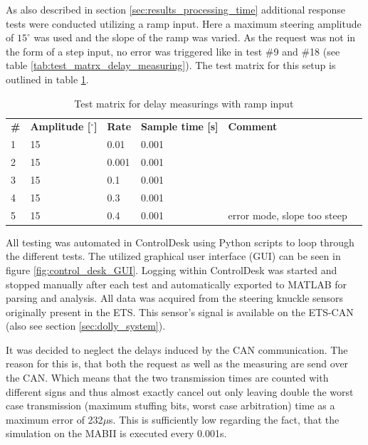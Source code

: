 \documentclass[ExampleMasters.tex]{subfiles}
\begin{document}


As also described in section \ref{sec:results_processing_time} additional response tests were conducted utilizing a ramp input. Here a maximum steering amplitude of $15^\circ $ was used and the slope of the ramp was varied. As the request was not in the form of a step input, no error was triggered like in test \#9 and \#18 (see table \ref{tab:test_matrx_delay_measuring}). The test matrix for this setup is outlined in table \ref{tab:test_matrx_ramp_input}. 

\begin{table}[h]
	\label{tab:test_matrx_ramp_input}
	\centering
\begin{tabular}{llllll}
 \textbf{\#} &\textbf{ Amplitude [$^\circ$]} & \textbf{Rate} & \textbf{Sample time [s]} & \textbf{Comment} &  \\ 
1	  &  15 & 0.01 & 0.001 &   \\ 
2	  & 15 & 0.001 &  0.001&  \\ 
3	  & 15 & 0.1 &  0.001&   \\ 
4	  & 15 & 0.3 & 	 0.001&   \\ 
5	  & 15 & 0.4 & 0.001 &  error mode, slope too steep\\ 

\end{tabular} 
\caption{Test matrix for delay measurings with ramp input}
\end{table}


All testing was automated in ControlDesk using Python scripts to loop through the different tests. The utilized graphical user interface (GUI) can be seen in figure \ref{fig:control_desk_GUI}. Logging within ControlDesk was started and stopped manually after each test and automatically exported to MATLAB for parsing and analysis. All data was acquired from the steering knuckle sensors originally present in the ETS. This sensor's signal is available on the ETS-CAN (also see section \ref{sec:dolly_system}). 

It was decided to neglect the delays induced by the CAN communication. The reason for this is, that both the request as well as the measuring are send over the CAN. Which means that the two transmission times are counted with different signs and thus almost exactly cancel out only leaving double the worst case transmission (maximum stuffing bits, worst case arbitration) time as a maximum error of 232$\mu$s. This is sufficiently low regarding the fact, that the simulation on the MABII is executed every 0.001s.    
\end{document}
